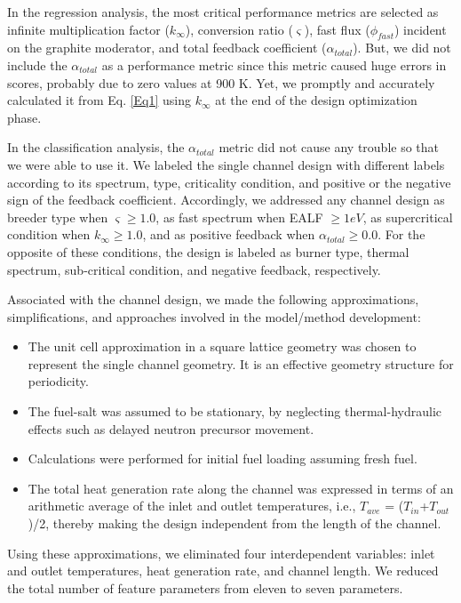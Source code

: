     In the regression analysis, the most critical performance metrics are selected as infinite multiplication factor ($k_{\infty}$), conversion ratio ($\varsigma$), fast flux ($\phi_{fast}$) incident on the graphite moderator, and total feedback coefficient (${\alpha_{total}}$). But, we did not include the ${\alpha_{total}}$ as a performance metric since this metric caused huge errors in scores, probably due to zero values at 900 K. Yet, we promptly and accurately calculated it from Eq. \protect\ref{Eq1} using $k_{\infty}$ at the end of the design optimization phase.

    In the classification analysis, the ${\alpha_{total}}$ metric did not cause any trouble so that we were able to use it. We labeled the single channel design with different labels according to its spectrum, type, criticality condition, and positive or the negative sign of the feedback coefficient. Accordingly, we addressed any channel design as breeder type when $\varsigma \geq 1.0$, as fast spectrum when \gls{EALF} $\geq 1eV$, as supercritical condition when $k_{\infty} \geq 1.0$, and as positive feedback when ${\alpha_{total}} \geq 0.0$. For the opposite of these conditions, the design is labeled as burner type, thermal spectrum, sub-critical condition, and negative feedback, respectively.

    Associated with the channel design, we made the following approximations, simplifications, and approaches involved in the model/method development:
    \begin{itemize}
    	\item The unit cell approximation in a square lattice geometry was chosen to represent the single channel geometry. It is an effective geometry structure for periodicity.
    	\item The fuel-salt was assumed to be stationary, by neglecting thermal-hydraulic effects such as delayed neutron precursor movement.
    	\item Calculations were performed for initial fuel loading assuming fresh fuel.
    	\item The total heat generation	rate along the channel was expressed in terms of an arithmetic average of the inlet and outlet temperatures, i.e., $T_{ave}$ = ($T_{in}$+$T_{out}$)/2, thereby making the design independent from the length	of the channel.
    \end{itemize}

    Using these approximations, we eliminated four interdependent variables: inlet and outlet temperatures, heat generation rate, and channel length. We reduced the total number of feature parameters from eleven to seven parameters.

